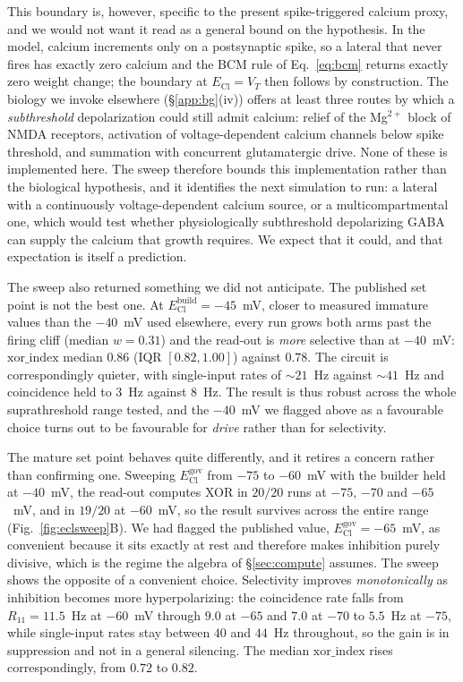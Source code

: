 \documentclass[11pt,a4paper]{article}
\newcommand{\ECl}{E_{\mathrm{Cl}}}
\begin{document}
This boundary is, however, specific to the present spike-triggered calcium proxy, and we would not want it read as a general bound on the hypothesis. In the model, calcium increments only on a postsynaptic spike, so a lateral that never fires has exactly zero calcium and the BCM rule of Eq.~\eqref{eq:bcm} returns exactly zero weight change; the boundary at $\ECl=V_T$ then follows by construction. The biology we invoke elsewhere (\S\ref{app:bg}(iv)) offers at least three routes by which a \emph{subthreshold} depolarization could still admit calcium: relief of the Mg$^{2+}$ block of NMDA receptors, activation of voltage-dependent calcium channels below spike threshold, and summation with concurrent glutamatergic drive. None of these is implemented here. The sweep therefore bounds this implementation rather than the biological hypothesis, and it identifies the next simulation to run: a lateral with a continuously voltage-dependent calcium source, or a multicompartmental one, which would test whether physiologically subthreshold depolarizing GABA can supply the calcium that growth requires. We expect that it could, and that expectation is itself a prediction.

The sweep also returned something we did not anticipate. The published set point is not the best one. At $\ECl^{\mathrm{build}}=-45$~mV, closer to measured immature values than the $-40$~mV used elsewhere, every run grows both arms past the firing cliff (median $w=0.31$) and the read-out is \emph{more} selective than at $-40$~mV: $\mathrm{xor\_index}$ median $0.86$ (IQR $[0.82,1.00]$) against $0.78$. The circuit is correspondingly quieter, with single-input rates of ${\sim}21$~Hz against ${\sim}41$~Hz and coincidence held to $3$~Hz against $8$~Hz. The result is thus robust across the whole suprathreshold range tested, and the $-40$~mV we flagged above as a favourable choice turns out to be favourable for \emph{drive} rather than for selectivity.

The mature set point behaves quite differently, and it retires a concern rather than confirming one. Sweeping $\ECl^{\mathrm{gov}}$ from $-75$ to $-60$~mV with the builder held at $-40$~mV, the read-out computes XOR in $20/20$ runs at $-75$, $-70$ and $-65$~mV, and in $19/20$ at $-60$~mV, so the result survives across the entire range (Fig.~\ref{fig:eclsweep}B). We had flagged the published value, $\ECl^{\mathrm{gov}}=-65$~mV, as convenient because it sits exactly at rest and therefore makes inhibition purely divisive, which is the regime the algebra of \S\ref{sec:compute} assumes. The sweep shows the opposite of a convenient choice. Selectivity improves \emph{monotonically} as inhibition becomes more hyperpolarizing: the coincidence rate falls from $R_{11}=11.5$~Hz at $-60$~mV through $9.0$ at $-65$ and $7.0$ at $-70$ to $5.5$~Hz at $-75$, while single-input rates stay between $40$ and $44$~Hz throughout, so the gain is in suppression and not in a general silencing. The median $\mathrm{xor\_index}$ rises correspondingly, from $0.72$ to $0.82$.
\end{document}
